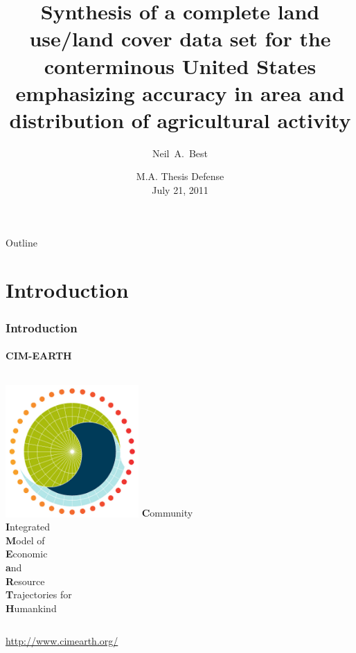 \documentclass{beamer}
\title[MA Defense]%
{Synthesis of a complete land use\slash land cover data set for the
  conterminous United States emphasizing accuracy in area and
  distribution of agricultural activity}
\author[N.~Best]%
{Neil~A.~Best}
\institute[G\&ES, NEIU; CI, UofC]%
{
  Department of Geography \& Environmental Studies \\
  Northeastern Illinois University
  \and
  Computation Institute \\
  University of Chicago}
\date[July 21, 2011] %
{M.A. Thesis Defense \\ July 21, 2011}
\begin{document}
\begin{frame}
  \titlepage
\end{frame}


\begin{frame}{Outline}
  \tableofcontents[pausesections]
\end{frame}






\section{Introduction}

\begin{frame}
  \frametitle{Introduction}
  \framesubtitle{CIM-EARTH}
  \begin{columns}[c]
  \column{2.0in}
  \includegraphics[width=2.0in]{cim-earth}
  \column{2.0in}
  \textbf{C}ommunity \\
  \textbf{I}ntegrated \\
  \textbf{M}odel of \\
  \textbf{E}conomic \\
  \textbf{a}nd \\
  \textbf{R}esource \\
  \textbf{T}rajectories for \\
  \textbf{H}umankind
  \end{columns}
  \centering
  \url{http://www.cimearth.org/}
\end{frame}
\end{document}
